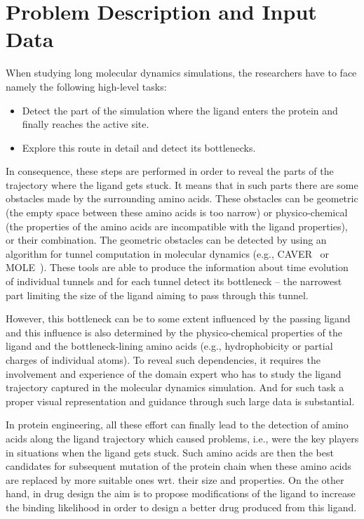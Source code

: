 \documentclass[twocolumn]{bmcart}%
\begin{document}
\section*{Problem Description and Input Data}
When studying long molecular dynamics simulations, the researchers have to face namely the following high-level tasks:
\begin{itemize}
\item Detect the part of the simulation where the ligand enters the protein and finally reaches the active site.
\item Explore this route in detail and detect its bottlenecks.
\end{itemize}
In consequence, these steps are performed in order to reveal the parts of the trajectory where the ligand gets stuck.
It means that in such parts there are some obstacles made by the surrounding amino acids.
These obstacles can be geometric (the empty space between these amino acids is too narrow) or physico-chemical (the properties of the amino acids are incompatible with the ligand properties), or their combination.
The geometric obstacles can be detected by using an algorithm for tunnel computation in molecular dynamics (e.g., CAVER~\cite{Chovancova2012} or MOLE~\cite{Sehnal2013}).
These tools are able to produce the information about time evolution of individual tunnels and for each tunnel detect its bottleneck -- the narrowest part limiting the size of the ligand aiming to pass through this tunnel.

However, this bottleneck can be to some extent influenced by the passing ligand and this influence is also determined by the physico-chemical properties of the ligand and the bottleneck-lining amino acids (e.g., hydrophobicity or partial charges of individual atoms).
To reveal such dependencies, it requires the involvement and experience of the domain expert who has to study the ligand trajectory captured in the molecular dynamics simulation.
And for such task a proper visual representation and guidance through such large data is substantial.

In protein engineering, all these effort can finally lead to the detection of amino acids along the ligand trajectory which caused problems, i.e., were the key players in situations when the ligand gets stuck.
Such amino acids are then the best candidates for subsequent mutation of the protein chain when these amino acids are replaced by more suitable ones wrt. their size and properties.
On the other hand, in drug design the aim is to propose modifications of the ligand to increase the binding likelihood in order to design a better drug produced from this ligand.
\end{document}
